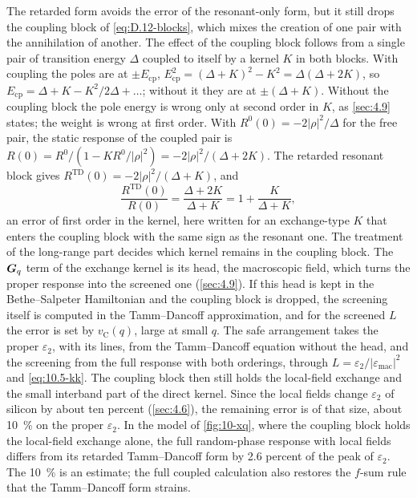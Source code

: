 The retarded form avoids the error of the resonant-only form, but it still drops the coupling block of \cref{eq:D.12-blocks}, which mixes the creation of one pair with the annihilation of another. The effect of the coupling block follows from a single pair of transition energy $\Delta$ coupled to itself by a kernel $K$ in both blocks. With coupling the poles are at $\pm E_{\mathrm{cp}}$, $E_{\mathrm{cp}}^2 = (\Delta + K)^2 - K^2 = \Delta(\Delta + 2K)$, so $E_{\mathrm{cp}} = \Delta + K - K^2/2\Delta + \dots$; without it they are at $\pm(\Delta + K)$. Without the coupling block the pole energy is wrong only at second order in $K$, as \cref{sec:4.9} states; the weight is wrong at first order. With $R^0(0) = -2|\rho|^2/\Delta$ for the free pair, the static response of the coupled pair is $R(0) = R^0/(1 - KR^0/|\rho|^2) = -2|\rho|^2/(\Delta + 2K)$. The retarded resonant block gives $R^{\mathrm{TD}}(0) = -2|\rho|^2/(\Delta + K)$, and
\begin{equation}
  \frac{R^{\mathrm{TD}}(0)}{R(0)} = \frac{\Delta + 2K}{\Delta + K} = 1 + \frac{K}{\Delta + K} ,
  \label{eq:10.5-coupling}
\end{equation}
an error of first order in the kernel, here written for an exchange-type $K$ that enters the coupling block with the same sign as the resonant one. The treatment of the long-range part decides which kernel remains in the coupling block. The $\bm{G}_q$ term of the exchange kernel is its head, the macroscopic field, which turns the proper response into the screened one (\cref{sec:4.9}). If this head is kept in the Bethe--Salpeter Hamiltonian and the coupling block is dropped, the screening itself is computed in the Tamm--Dancoff approximation, and for the screened $L$ the error is set by $v_{\mathrm{C}}(q)$, large at small $q$. The safe arrangement takes the proper $\varepsilon_2$, with its lines, from the Tamm--Dancoff equation without the head, and the screening from the full response with both orderings, through $L = \varepsilon_2/|\varepsilon_{\mathrm{mac}}|^2$ and \cref{eq:10.5-kk}. The coupling block then still holds the local-field exchange and the small interband part of the direct kernel. Since the local fields change $\varepsilon_2$ of silicon by about ten percent (\cref{sec:4.6}), the remaining error is of that size, about \SI{10}{\percent} on the proper $\varepsilon_2$. In the model of \cref{fig:10-xq}, where the coupling block holds the local-field exchange alone, the full random-phase response with local fields differs from its retarded Tamm--Dancoff form by 2.6 percent of the peak of $\varepsilon_2$. The \SI{10}{\percent} is an estimate; the full coupled calculation also restores the $f$-sum rule that the Tamm--Dancoff form strains.

